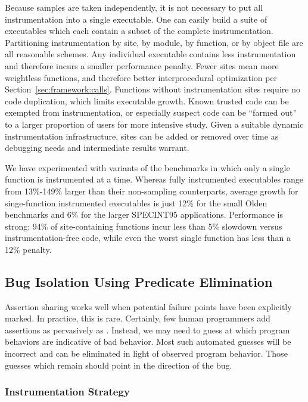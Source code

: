 Because samples are taken independently, it is not necessary to put
all instrumentation into a single executable.  One can easily build a
suite of executables which each contain a subset of the complete
instrumentation.  Partitioning instrumentation by site, by module, by
function, or by object file are all reasonable schemes.  Any
individual executable contains less instrumentation and therefore
incurs a smaller performance penalty.  Fewer sites mean more
weightless functions, and therefore better interprocedural
optimization per Section~\ref{sec:framework:calls}.  Functions without
instrumentation sites require no code duplication, which limits
executable growth.  Known trusted code can be exempted from
instrumentation, or especially suspect code can be ``farmed out'' to a
larger proportion of users for more intensive study.  Given a suitable
dynamic instrumentation infrastructure, sites can be added or removed
over time as debugging needs and intermediate results warrant.

We have experimented with variants of the \CCured benchmarks in which
only a single function is instrumented at a time.  Whereas fully
instrumented executables range from 13\%-149\% larger than their
non-sampling counterparts, average growth for singe-function
instrumented executables is just 12\% for the small Olden benchmarks
and 6\% for the larger SPECINT95 applications.  Performance is strong:
94\% of site-containing functions incur less than 5\% slowdown versus
instrumentation-free code, while even the worst single function has
less than a 12\% penalty.

\subsection{Bug Isolation Using Predicate Elimination}
\label{sec:ccrypt}

Assertion sharing works well when potential failure points have been
explicitly marked.  In practice, this is rare.  Certainly, few human
programmers add assertions as pervasively as \CCured.  Instead,
we may need to guess at which program behaviors are indicative of bad
behavior.  Most such automated guesses will be incorrect and can be
eliminated in light of observed program behavior.  Those guesses which
remain should point in the direction of the bug.

\subsubsection{Instrumentation Strategy}

